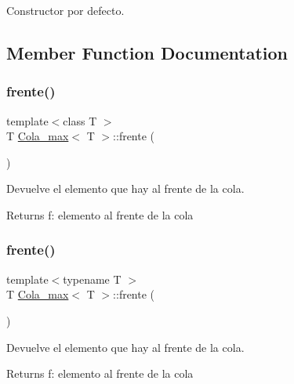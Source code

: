 Constructor por defecto. 



\subsection{Member Function Documentation}
\mbox{\label{class_cola__max_ad24d6ded47e7696c53dd10e33cce403e}} 
\subsubsection{\texorpdfstring{frente()}{frente()}\hspace{0.1cm}{\footnotesize\ttfamily [1/2]}}
{\footnotesize\ttfamily template$<$class T $>$ \\
T \mbox{\hyperlink{class_cola__max}{Cola\+\_\+max}}$<$ T $>$\+::frente (\begin{DoxyParamCaption}{ }\end{DoxyParamCaption})}



Devuelve el elemento que hay al frente de la cola. 

\begin{DoxyReturn}{Returns}
f\+: elemento al frente de la cola 
\end{DoxyReturn}
\mbox{\label{class_cola__max_ad24d6ded47e7696c53dd10e33cce403e}} 
\subsubsection{\texorpdfstring{frente()}{frente()}\hspace{0.1cm}{\footnotesize\ttfamily [2/2]}}
{\footnotesize\ttfamily template$<$typename T $>$ \\
T \mbox{\hyperlink{class_cola__max}{Cola\+\_\+max}}$<$ T $>$\+::frente (\begin{DoxyParamCaption}{ }\end{DoxyParamCaption})}



Devuelve el elemento que hay al frente de la cola. 

\begin{DoxyReturn}{Returns}
f\+: elemento al frente de la cola 
\end{DoxyReturn}
\mbox{\label{class_cola__max_a3df6075351dfd7c9e9a436a6d430e170}} 
